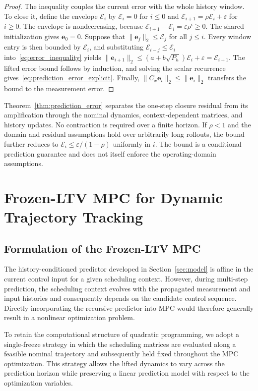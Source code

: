 \documentclass[journal]{IEEEtran}
\newcommand{\ve}{\mathbf{e}}
\newcommand{\norm}[2][]{\mathopen{#1\lVert}#2\mathclose{#1\rVert}}
\theoremstyle{plain}
\theoremstyle{definition}
\theoremstyle{definition}
\begin{document}
\begin{proof}
The inequality couples the current error with the whole history
window. To close it, define the envelope $\mathcal E_i$ by $\mathcal E_i=0$ for $i\le0$
and $\mathcal E_{i+1}=\rho \mathcal E_i+\varepsilon$ for $i\ge0$. The envelope is
nondecreasing, because $\mathcal E_{i+1}-\mathcal E_i=\varepsilon\rho^i\ge0$. The shared
initialization gives $\ve_0=0$. Suppose that $\norm{\ve_j}_2\le \mathcal E_j$
for all $j\le i$. Every window entry is then bounded by $\mathcal E_i$, and
substituting $\mathcal E_{i-j}\le \mathcal E_i$ into~\eqref{eq:error_inequality} yields
$\norm{\ve_{i+1}}_2\le(a+b\sqrt{P_h})\mathcal E_i+\varepsilon=\mathcal E_{i+1}$.
The lifted error bound follows by induction, and solving the scalar
recurrence gives~\eqref{eq:prediction_error_explicit}. Finally,
$\norm{C_x\ve_i}_2\le\norm{\ve_i}_2$ transfers the bound to the
measurement error.
\end{proof}

Theorem~\ref{thm:prediction_error} separates the one-step closure
residual from its amplification through the nominal dynamics,
context-dependent matrices, and history updates. No contraction is
required over a finite horizon. If $\rho<1$ and the domain and residual
assumptions hold over arbitrarily long rollouts, the bound further
reduces to $\mathcal E_i\le\varepsilon/(1-\rho)$ uniformly in $i$. The bound is
a conditional prediction guarantee and does not itself enforce the
operating-domain assumptions.

\begingroup
\section{Frozen-LTV MPC for Dynamic Trajectory Tracking}
\label{sec:control}

\subsection{Formulation of the Frozen-LTV MPC}
\label{sec:frozen_mpc_formulation}

The history-conditioned predictor developed in Section~\ref{sec:model}
is affine in the current control input for a given scheduling
context. However, during multi-step prediction, the scheduling
context evolves with the propagated measurement and input
histories and consequently depends on the candidate control
sequence. Directly incorporating the recursive predictor into
MPC would therefore generally result in a nonlinear
optimization problem.

To retain the computational structure of quadratic programming,
we adopt a single-freeze strategy in which the scheduling
matrices are evaluated along a feasible nominal trajectory
and subsequently held fixed throughout the MPC optimization.
This strategy allows the lifted dynamics to vary across the
prediction horizon while preserving a linear prediction model
with respect to the optimization variables.
\end{document}

